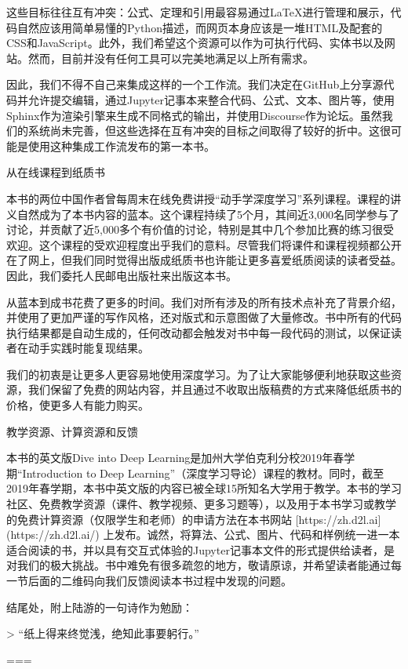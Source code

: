 这些目标往往互有冲突：公式、定理和引用最容易通过LaTeX进行管理和展示，代码自然应该用简单易懂的Python描述，而网页本身应该是一堆HTML及配套的CSS和JavaScript。此外，我们希望这个资源可以作为可执行代码、实体书以及网站。然而，目前并没有任何工具可以完美地满足以上所有需求。

因此，我们不得不自己来集成这样的一个工作流。我们决定在GitHub上分享源代码并允许提交编辑，通过Jupyter记事本来整合代码、公式、文本、图片等，使用Sphinx作为渲染引擎来生成不同格式的输出，并使用Discourse作为论坛。虽然我们的系统尚未完善，但这些选择在互有冲突的目标之间取得了较好的折中。这很可能是使用这种集成工作流发布的第一本书。

 从在线课程到纸质书

本书的两位中国作者曾每周末在线免费讲授“动手学深度学习”系列课程。课程的讲义自然成为了本书内容的蓝本。这个课程持续了5个月，其间近3,000名同学参与了讨论，并贡献了近5,000多个有价值的讨论，特别是其中几个参加比赛的练习很受欢迎。这个课程的受欢迎程度出乎我们的意料。尽管我们将课件和课程视频都公开在了网上，但我们同时觉得出版成纸质书也许能让更多喜爱纸质阅读的读者受益。因此，我们委托人民邮电出版社来出版这本书。

从蓝本到成书花费了更多的时间。我们对所有涉及的所有技术点补充了背景介绍，并使用了更加严谨的写作风格，还对版式和示意图做了大量修改。书中所有的代码执行结果都是自动生成的，任何改动都会触发对书中每一段代码的测试，以保证读者在动手实践时能复现结果。

我们的初衷是让更多人更容易地使用深度学习。为了让大家能够便利地获取这些资源，我们保留了免费的网站内容，并且通过不收取出版稿费的方式来降低纸质书的价格，使更多人有能力购买。

 

 教学资源、计算资源和反馈

本书的英文版Dive into Deep Learning是加州大学伯克利分校2019年春学期“Introduction to Deep Learning”（深度学习导论）课程的教材。同时，截至2019年春学期，本书中英文版的内容已被全球15所知名大学用于教学。本书的学习社区、免费教学资源（课件、教学视频、更多习题等），以及用于本书学习或教学的免费计算资源（仅限学生和老师）的申请方法在本书网站 [https://zh.d2l.ai](https://zh.d2l.ai/) 上发布。诚然，将算法、公式、图片、代码和样例统一进一本适合阅读的书，并以具有交互式体验的Jupyter记事本文件的形式提供给读者，是对我们的极大挑战。书中难免有很多疏忽的地方，敬请原谅，并希望读者能通过每一节后面的二维码向我们反馈阅读本书过程中发现的问题。

结尾处，附上陆游的一句诗作为勉励：

> “纸上得来终觉浅，绝知此事要躬行。”

===

